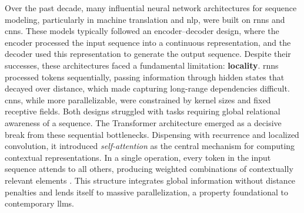 Over the past decade, many influential neural network architectures for
sequence modeling, particularly in machine translation and \gls{nlp}, were built
on \glspl{rnn} and \glspl{cnn}. These models typically followed an
encoder–decoder design, where the encoder processed the input sequence into a
continuous representation, and the decoder used this representation to
generate the output sequence. Despite their successes, these architectures faced a fundamental limitation:
\textbf{locality}. \glspl{rnn} processed tokens sequentially, passing information
through hidden states that decayed over distance, which made capturing
long-range dependencies difficult. \glspl{cnn}, while more parallelizable, were
constrained by \gls{kernel} sizes and fixed receptive fields. Both designs
struggled with tasks requiring global relational awareness of a sequence. The Transformer architecture \parencite{vaswani2017a} emerged as a decisive
break from these sequential bottlenecks. Dispensing with recurrence and
localized convolution, it introduced \emph{self-attention} as the central
mechanism for computing contextual representations. In a single operation, every
\gls{token} in the input sequence attends to all others, producing
weighted combinations of contextually relevant elements \parencite[4]{vaswani2017a}.
This structure integrates global information without distance penalties and
lends itself to massive parallelization, a property foundational to
contemporary \glspl{llm}.


